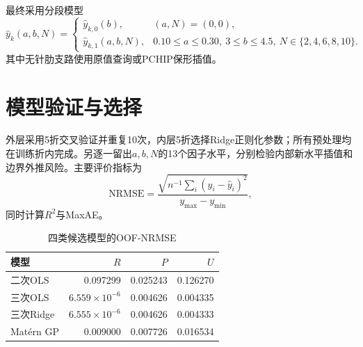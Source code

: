 \documentclass[UTF8,12pt,a4paper]{ctexart}
\begin{document}
最终采用分段模型
\[
\widehat y_k(a,b,N)=
\begin{cases}
\widehat y_{k,0}(b),&(a,N)=(0,0),\\
\widehat y_{k,1}(a,b,N),&0.10\le a\le0.30,\ 3\le b\le4.5,\ N\in\{2,4,6,8,10\}.
\end{cases}
\]
其中无针肋支路使用原值查询或PCHIP保形插值。

\section{模型验证与选择}
外层采用5折交叉验证并重复10次，内层5折选择Ridge正则化参数；所有预处理均在训练折内完成。另逐一留出$a,b,N$的13个因子水平，分别检验内部新水平插值和边界外推风险。主要评价指标为
\[
\mathrm{NRMSE}=\frac{\sqrt{n^{-1}\sum_i(y_i-\widehat y_i)^2}}{y_{\max}-y_{\min}},
\]
同时计算$R^2$与MaxAE。

\begin{table}[H]\centering\small
\caption{四类候选模型的OOF-NRMSE}\label{tab:oof}
\begin{tabular}{lrrr}
\toprule
模型 & $R$ & $P$ & $U$ \\
\midrule
二次OLS & 0.097299 & 0.025243 & 0.126270 \\
三次OLS & $6.559\times10^{-6}$ & 0.004626 & 0.004335 \\
三次Ridge & $6.555\times10^{-6}$ & 0.004626 & 0.004333 \\
Matérn GP & 0.009000 & 0.007726 & 0.016534 \\
\bottomrule
\end{tabular}
\end{table}
\end{document}
